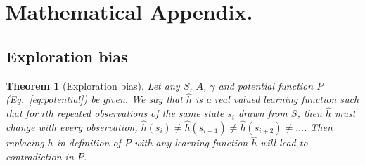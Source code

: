 \documentclass[9pt,lineno]{elife}
\newtheorem{theorem}{Theorem}
\begin{document}
\section*{Mathematical Appendix.}
\newcommand{\beginsupplement}{%
        \setcounter{table}{0}
        \renewcommand{\thetable}{S\arabic{table}}%
        \setcounter{figure}{0}
        \renewcommand{\thefigure}{S\arabic{figure}}%
     }
\beginsupplement
\setcounter{theorem}{0}

\subsection*{Exploration bias}
\begin{theorem}[Exploration bias]
\label{th:potential}
Let any $S$, $A$, $\gamma$ and potential function $P$ (Eq.~\ref{eq:potential}) be given. We say that $\hat h$ is a real valued learning function such that for $i$th repeated observations of the same state $s_i$ drawn from $S$, then $\hat h$ must change with every observation, $\hat h(s_i) \neq \hat h(s_{i+1}) \neq \hat h(s_{i+2}) \neq \ldots$. Then replacing $h$ in definition of $P$ with \textit{any} learning function $\hat h$ will lead to contradiction in $P$.
\end{theorem}
\end{document}
